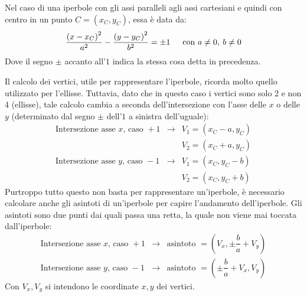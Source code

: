 \documentclass[a4paper]{article}
\begin{document}
	\noindent
	Nel caso di una iperbole con gli assi paralleli agli assi cartesiani e quindi con centro in un punto $C = \left(x_{C}, y_{C}\right)$, essa è data da:
	\begin{equation*}
		\dfrac{\left(x-x_{C}\right)^{2}}{a^{2}} - \dfrac{\left(y-y_{C}\right)^{2}}{b^{2}} = \pm 1 \hspace{1.5em} \text{con } a \ne 0, \: b \ne 0
	\end{equation*}
	Dove il segno $\pm$ accanto all'$1$ indica la stessa cosa detta in precedenza.\newline
	
	\noindent
	Il calcolo dei vertici, utile per rappresentare l'iperbole, ricorda molto quello utilizzato per l'ellisse. Tuttavia, dato che in questo caso i vertici sono solo 2 e non 4 (ellisse), tale calcolo cambia a seconda dell'intersezione con l'asse delle $x$ o delle $y$ (determinato dal segno $\pm$ dell'$1$ a sinistra dell'uguale):
	\begin{equation*}
		\begin{array}{rcl}
			\text{Intersezione asse }x\text{, caso }+1 &\rightarrow& V_{1} = \left(x_{C}-a, y_{C}\right) \\ [.3em]
			&& V_{2} = \left(x_{C}+a, y_{C}\right) \\ [1em]
			\text{Intersezione asse }y\text{, caso }-1 &\rightarrow& V_{1} = \left(x_{C}, y_{C}-b\right) \\ [.3em]
			&& V_{2} = \left(x_{C}, y_{C}+b\right)
		\end{array}
	\end{equation*}
	Purtroppo tutto questo non basta per rappresentare un'iperbole, è necessario calcolare anche gli asintoti di un'iperbole per capire l'andamento dell'iperbole. Gli asintoti sono due punti dai quali passa una retta, la quale non viene mai toccata dall'iperbole:
	\begin{equation*}
		\begin{array}{rcl}
			\text{Intersezione asse }x\text{, caso }+1 &\rightarrow& \text{asintoto } = \left(V_{x}, \pm\dfrac{b}{a} + V_{y}\right) \\ [1em]
			\text{Intersezione asse }y\text{, caso }-1 &\rightarrow& \text{asintoto } = \left(\pm\dfrac{b}{a} + V_{x}, V_{y}\right)
		\end{array}
	\end{equation*}
	Con $V_{x},V_{y}$ si intendono le coordinate $x,y$ dei vertici.\newline
\end{document}
